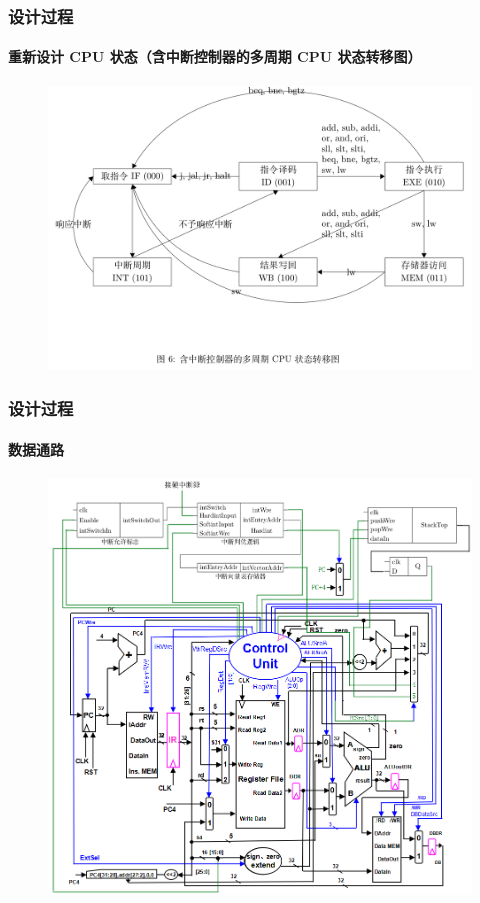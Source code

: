 \documentclass[xcolor=dvipsnames]{beamer}
\begin{document}
\begin{frame}
	\frametitle{设计过程}
	\framesubtitle{重新设计 CPU 状态（含中断控制器的多周期 CPU 状态转移图）}
	
	\begin{figure}
		\centering
		\includegraphics[scale=0.25]{img/6.png}
	\end{figure}
\end{frame}



\begin{frame}
	\frametitle{设计过程}
	\framesubtitle{数据通路}
	
	\begin{figure}
		\centering
		\includegraphics[scale=0.25]{../pics/DataPath.png}
	\end{figure}
\end{frame}
\end{document}
